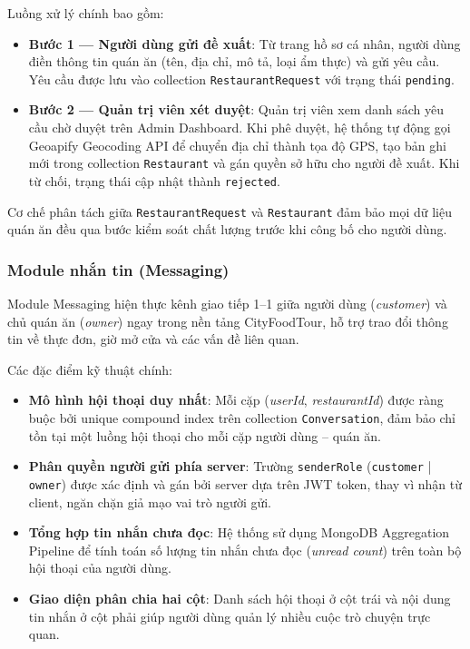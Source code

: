 Luồng xử lý chính bao gồm:
\begin{itemize}[label=\textbullet]
    \item \textbf{Bước 1 --- Người dùng gửi đề xuất}: Từ trang hồ sơ cá nhân, người dùng điền thông tin quán ăn (tên, địa chỉ, mô tả, loại ẩm thực) và gửi yêu cầu. Yêu cầu được lưu vào collection \texttt{RestaurantRequest} với trạng thái \texttt{pending}.
    \item \textbf{Bước 2 --- Quản trị viên xét duyệt}: Quản trị viên xem danh sách yêu cầu chờ duyệt trên Admin Dashboard. Khi phê duyệt, hệ thống tự động gọi Geoapify Geocoding API để chuyển địa chỉ thành tọa độ GPS, tạo bản ghi mới trong collection \texttt{Restaurant} và gán quyền sở hữu cho người đề xuất. Khi từ chối, trạng thái cập nhật thành \texttt{rejected}.
\end{itemize}

Cơ chế phân tách giữa \texttt{RestaurantRequest} và \texttt{Restaurant} đảm bảo mọi dữ liệu quán ăn đều qua bước kiểm soát chất lượng trước khi công bố cho người dùng.

\subsubsection{Module nhắn tin (Messaging)}
Module Messaging hiện thực kênh giao tiếp 1--1 giữa người dùng (\textit{customer}) và chủ quán ăn (\textit{owner}) ngay trong nền tảng CityFoodTour, hỗ trợ trao đổi thông tin về thực đơn, giờ mở cửa và các vấn đề liên quan.

Các đặc điểm kỹ thuật chính:
\begin{itemize}[label=\textbullet]
    \item \textbf{Mô hình hội thoại duy nhất}: Mỗi cặp (\textit{userId}, \textit{restaurantId}) được ràng buộc bởi unique compound index trên collection \texttt{Conversation}, đảm bảo chỉ tồn tại một luồng hội thoại cho mỗi cặp người dùng -- quán ăn.
    \item \textbf{Phân quyền người gửi phía server}: Trường \texttt{senderRole} (\texttt{customer} | \texttt{owner}) được xác định và gán bởi server dựa trên JWT token, thay vì nhận từ client, ngăn chặn giả mạo vai trò người gửi.
    \item \textbf{Tổng hợp tin nhắn chưa đọc}: Hệ thống sử dụng MongoDB Aggregation Pipeline để tính toán số lượng tin nhắn chưa đọc (\textit{unread count}) trên toàn bộ hội thoại của người dùng.
    \item \textbf{Giao diện phân chia hai cột}: Danh sách hội thoại ở cột trái và nội dung tin nhắn ở cột phải giúp người dùng quản lý nhiều cuộc trò chuyện trực quan.
\end{itemize}

